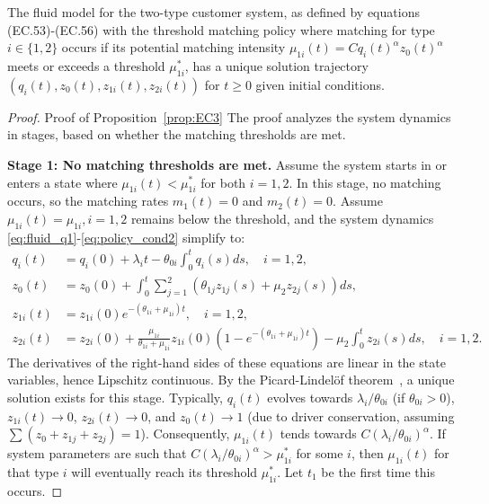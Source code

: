 \begin{proposition} \label{prop:EC3}
The fluid model for the two-type customer system, as defined by equations (EC.53)-(EC.56) with the threshold matching policy where matching for type $i \in \{1,2\}$ occurs if its potential matching intensity $\mu_{1i}(t) = C q_i(t)^{\alpha} z_0(t)^{\alpha}$ meets or exceeds a threshold $\mu_{1i}^*$, has a unique solution trajectory $(q_i(t), z_0(t), z_{1i}(t), z_{2i}(t))$ for $t \ge 0$ given initial conditions.
\end{proposition}

\begin{proof}{Proof of Proposition~\ref{prop:EC3}}
The proof analyzes the system dynamics in stages, based on whether the matching thresholds are met.

\textbf{Stage 1: No matching thresholds are met.}
Assume the system starts in or enters a state where $\mu_{1i}(t) < \mu_{1i}^*$ for both $i=1,2$.
In this stage, no matching occurs, so the matching rates $m_1(t) = 0$ and $m_2(t) = 0$.
Assume $\mu_{1i}(t) = \mu_{1i}, i=1,2$ remains below the threshold, and the system dynamics \eqref{eq:fluid_q1}-\eqref{eq:policy_cond2} simplify to:
\begin{align}
q_i(t) &= q_i(0) + \lambda_i t - \theta_{0i} \int_0^t q_i(s)ds, \quad i=1,2, \label{eq:EC.57} \\
z_0(t) &= z_0(0) + \int_0^t \sum_{j=1}^{2}(\theta_{1j}z_{1j}(s) + \mu_2z_{2j}(s))ds, \label{eq:EC.58} \\
z_{1i}(t) &= z_{1i}(0) e^{-(\theta_{1i} + \mu_{1i})t}, \quad i=1,2, \label{eq:EC.59} \\
z_{2i}(t) &= z_{2i}(0) + \frac{\mu_{1i}}{\theta_{1i} + \mu_{1i}} z_{1i}(0) (1 - e^{-(\theta_{1i} + \mu_{1i})t}) - \mu_2\int_0^t z_{2i}(s)ds, \quad i=1,2. \label{eq:EC.60}
\end{align}
The derivatives of the right-hand sides of these equations are linear in the state variables, hence Lipschitz continuous.
By the Picard-Lindel\"of theorem~\citep{coddington1955theory}, a unique solution exists for this stage.
Typically, $q_i(t)$ evolves towards $\lambda_i/\theta_{0i}$ (if $\theta_{0i}>0$),
$z_{1i}(t) \to 0$, $z_{2i}(t) \to 0$, and $z_0(t) \to 1$
(due to driver conservation, assuming $\sum (z_{0} + z_{1j} + z_{2j}) = 1$).
Consequently, $\mu_{1i}(t)$ tends towards $C (\lambda_i/\theta_{0i})^{\alpha}$.
If system parameters are such that $C (\lambda_i/\theta_{0i})^{\alpha} > \mu_{1i}^*$
for some $i$, then $\mu_{1i}(t)$ for that type $i$ will eventually reach its threshold
$\mu_{1i}^*$. Let $t_1$ be the first time this occurs.


\end{proof}
